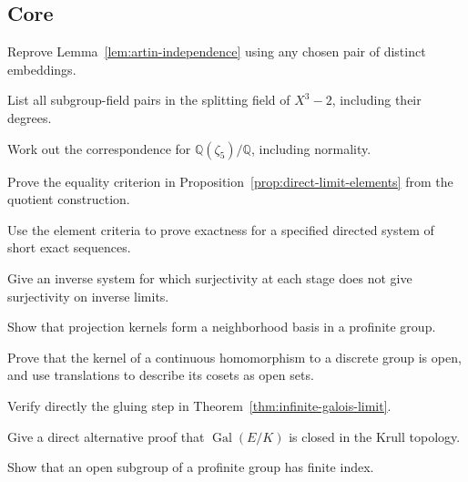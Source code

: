 \subsection*{Core}
\begin{exercise}[Core] Reprove Lemma~\ref{lem:artin-independence} using any
chosen pair of distinct embeddings.
\end{exercise}
\begin{exercise}[Core] List all subgroup-field pairs in the splitting field
of \(X^3-2\), including their degrees.
\end{exercise}
\begin{exercise}[Core] Work out the correspondence for
\(\mathbb Q(\zeta_5)/\mathbb Q\), including normality.
\end{exercise}
\begin{exercise}[Core] Prove the equality criterion in
Proposition~\ref{prop:direct-limit-elements} from the quotient construction.
\end{exercise}
\begin{exercise}[Core] Use the element criteria to prove exactness for a
specified directed system of short exact sequences.
\end{exercise}
\begin{exercise}[Core] Give an inverse system for which surjectivity at each
stage does not give surjectivity on inverse limits.
\end{exercise}
\begin{exercise}[Core] Show that projection kernels form a neighborhood basis
in a profinite group.
\end{exercise}
\begin{exercise}[Core] Prove that the kernel of a continuous homomorphism to a
discrete group is open, and use translations to describe its cosets as open
sets.
\end{exercise}
\begin{exercise}[Core] Verify directly the gluing step in
Theorem~\ref{thm:infinite-galois-limit}.
\end{exercise}
\begin{exercise}[Core] Give a direct alternative proof that
\(\operatorname{Gal}(E/K)\) is closed in the Krull topology.
\end{exercise}
\begin{exercise}[Core] Show that an open subgroup of a profinite group has
finite index.
\end{exercise}

